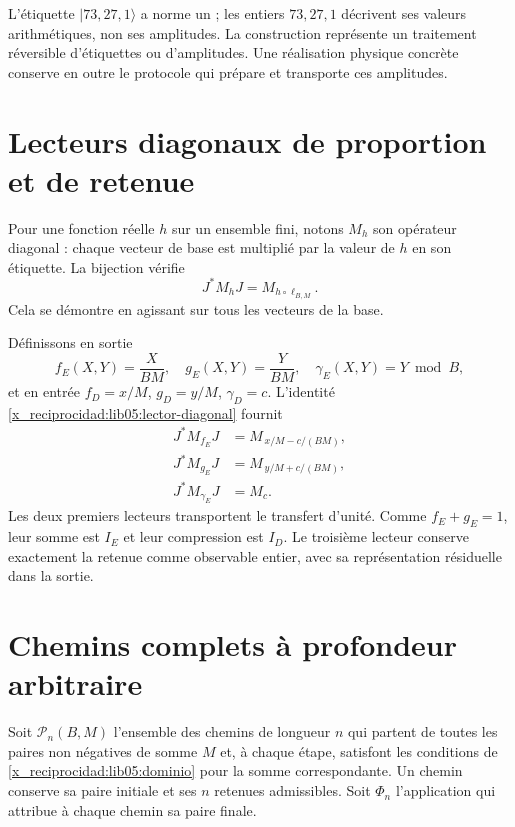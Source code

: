 L’étiquette \(|73,27,1\rangle\) a norme un ; les entiers
\(73,27,1\) décrivent ses valeurs arithmétiques, non ses amplitudes.
La construction représente un traitement réversible d’étiquettes
ou d’amplitudes. Une réalisation physique concrète conserve en outre
le protocole qui prépare et transporte ces amplitudes.

\section{Lecteurs diagonaux de proportion et de retenue}
\label{x_reciprocidad:lib05:diagonales}

Pour une fonction réelle \(h\) sur un ensemble fini, notons
\(M_h\) son opérateur diagonal : chaque vecteur de base est multiplié
par la valeur de \(h\) en son étiquette. La bijection vérifie
\begin{equation}
 J^*M_hJ=M_{h\circ\ell_{B,M}}.
 \label{x_reciprocidad:lib05:lector-diagonal}
\end{equation}
Cela se démontre en agissant sur tous les vecteurs de la base.

Définissons en sortie
\begin{equation}
 f_E(X,Y)=\frac{X}{BM},\quad
 g_E(X,Y)=\frac{Y}{BM},\quad
 \gamma_E(X,Y)=Y\bmod B,
 \label{x_reciprocidad:lib05:lectores-salida}
\end{equation}
et en entrée \(f_D=x/M\), \(g_D=y/M\), \(\gamma_D=c\). L'identité \eqref{x_reciprocidad:lib05:lector-diagonal} fournit
\begin{align}
 J^*M_{f_E}J&=M_{\,x/M-c/(BM)},\nonumber\\
 J^*M_{g_E}J&=M_{\,y/M+c/(BM)},\nonumber\\
 J^*M_{\gamma_E}J&=M_c.
 \label{x_reciprocidad:lib05:transporte-fracciones}
\end{align}
Les deux premiers lecteurs transportent le transfert d’unité.
Comme \(f_E+g_E=1\), leur somme est \(I_E\) et leur compression est
\(I_D\). Le troisième lecteur conserve exactement la retenue comme
observable entier, avec sa représentation résiduelle dans la sortie.

\section{Chemins complets à profondeur arbitraire}
\label{x_reciprocidad:lib05:rutas}

Soit \(\mathcal P_n(B,M)\) l'ensemble des chemins de longueur \(n\) qui partent de toutes les paires non négatives de somme \(M\) et, à chaque étape, satisfont les conditions de \eqref{x_reciprocidad:lib05:dominio} pour la somme correspondante. Un chemin conserve sa paire initiale et ses \(n\) retenues admissibles. Soit \(\Phi_n\) l'application qui attribue à chaque chemin sa paire finale.


